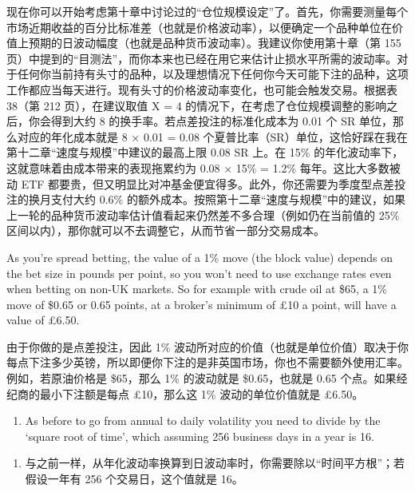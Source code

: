 \begin{chineseblock}现在你可以开始考虑第十章中讨论过的“仓位规模设定”了。首先，你需要测量每个市场近期收益的百分比标准差（也就是价格波动率），以便确定一个品种单位在价值上预期的日波动幅度（也就是品种货币波动率）。我建议你使用第十章（第 155 页）中提到的“目测法”，而你本来也已经在用它来估计止损水平所需的波动率。对于任何你当前持有头寸的品种，以及理想情况下任何你今天可能下注的品种，这项工作都应当每天进行。现有头寸的价格波动率变化，也可能会触发交易。根据表 38（第 212 页），在建议取值 X = 4 的情况下，在考虑了仓位规模调整的影响之后，你会得到大约 8 的换手率。若点差投注的标准化成本为 0.01 个 SR 单位，那么对应的年化成本就是 8 × 0.01 = 0.08 个夏普比率（SR）单位，这恰好踩在我在第十二章“速度与规模”中建议的最高上限 0.08 SR 上。在 15\% 的年化波动率下，这就意味着由成本带来的表现拖累约为 0.08 × 15\% = 1.2\% 每年。这比大多数被动 ETF 都要贵，但又明显比对冲基金便宜得多。此外，你还需要为季度型点差投注的换月支付大约 0.6\% 的额外成本。按照第十二章“速度与规模”中的建议，如果上一轮的品种货币波动率估计值看起来仍然差不多合理（例如仍在当前值的 25\% 区间以内），那你就可以不去调整它，从而节省一部分交易成本。\end{chineseblock}

\bipairgap

\begin{englishblock} As you're spread betting, the value of a 1\% move (the block value) depends on the bet size in pounds per point, so you won't need to use exchange rates even when betting on non-UK markets. So for example with crude oil at \$65, a 1\% move of \$0.65 or 0.65 points, at a broker's minimum of £10 a point, will have a value of £6.50. \end{englishblock}

\begin{chineseblock}由于你做的是点差投注，因此 1\% 波动所对应的价值（也就是单位价值）取决于你每点下注多少英镑，所以即便你下注的是非英国市场，你也不需要额外使用汇率。例如，若原油价格是 \$65，那么 1\% 的波动就是 \$0.65，也就是 0.65 个点。如果经纪商的最小下注额是每点 £10，那么这 1\% 波动的单位价值就是 £6.50。 \end{chineseblock}

\begin{enumerate}
\item As before to go from annual to daily volatility you need to divide by the ‘square root of time', which assuming 256 business days in a year is 16. \end{enumerate}

\begin{enumerate}
\item 与之前一样，从年化波动率换算到日波动率时，你需要除以“时间平方根”；若假设一年有 256 个交易日，这个值就是 16。 \end{enumerate}


